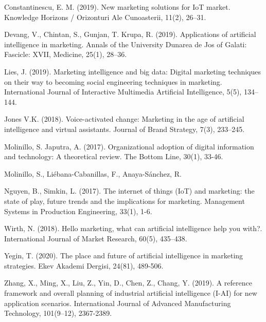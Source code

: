 \documentclass[a4paper, 12pt, twocolumn]{article}
\begin{document}
Constantinescu, E. M. (2019). New marketing solutions for
IoT market. Knowledge Horizons / Orizonturi Ale Cunoasterii, 11(2), 26–31.

Devang, V., Chintan, S., Gunjan, T. Krupa, R. (2019).
Applications of artificial intelligence in marketing. Annals of the University Dunarea de Jos of Galati: Fascicle: XVII, Medicine, 25(1), 28–36.

Lies, J. (2019). Marketing intelligence and big data: Digital
marketing techniques on their way to becoming social engineering techniques in marketing. International Journal of Interactive Multimedia Artificial Intelligence, 5(5), 134–144.

Jones V.K. (2018). Voice-activated change: Marketing in the
age of artificial intelligence and virtual assistants. Journal of
Brand Strategy, 7(3), 233–245. 

Molinillo, S. Japutra, A. (2017). Organizational adoption of digital information and technology: A theoretical review. The Bottom Line, 30(1), 33-46. 

Molinillo, S., Liébana-Cabanillas, F., Anaya-Sánchez, R. 

Nguyen, B., Simkin, L. (2017). The internet of things
(IoT) and marketing: the state of play, future trends and the
implications for marketing. Management Systems in Production Engineering, 33(1), 1-6.

Wirth, N. (2018). Hello marketing, what can artificial intelligence help you with?. International Journal of Market Research, 60(5), 435–438.

Yegin, T. (2020). The place and future of artificial intelligence in marketing strategies. Ekev Akademi Dergisi, 24(81),
489-506.

Zhang, X., Ming, X., Liu, Z., Yin, D., Chen, Z., Chang, Y. (2019). A reference framework and overall planning of industrial artificial intelligence (I-AI) for new application scenarios. International Journal of Advanced Manufacturing Technology, 101(9–12), 2367-2389.
\end{document}

